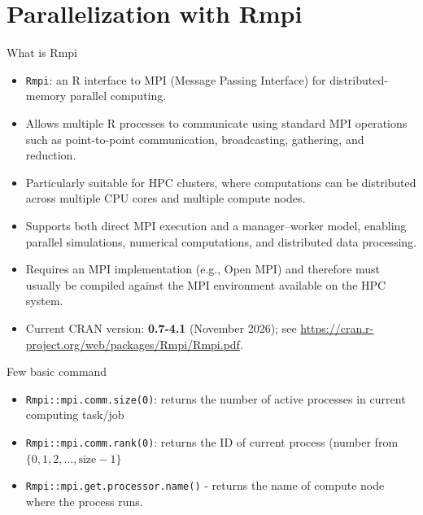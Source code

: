 \documentclass[compress,xcolor=table]{beamer}
\begin{document}
	
	
\section{Parallelization with Rmpi}
%




	
	\begin{frame}[fragile]{What  is Rmpi}
\begin{itemize} \footnotesize
	\item \texttt{Rmpi}: an R interface to MPI (Message Passing Interface) for distributed-memory parallel computing. 
	\item Allows multiple R processes to communicate using standard MPI operations such as point-to-point communication, broadcasting, gathering, and reduction. \item Particularly suitable for HPC clusters, where computations can be distributed across multiple CPU cores and multiple compute nodes. 
	\item Supports both direct MPI execution and a manager--worker model, enabling parallel simulations, numerical computations, and distributed data processing. \item Requires an MPI implementation (e.g., Open MPI) and therefore must usually be compiled against the MPI environment available on the HPC system. 
	\item Current CRAN version: \textbf{0.7-4.1} (November 2026); see \url{https://cran.r-project.org/web/packages/Rmpi/Rmpi.pdf}. 
\end{itemize}
	\end{frame}
	
	
	\begin{frame}{Few basic command}
		\begin{itemize}
			\item {\tt Rmpi::mpi.comm.size(0)}: returns the number of active processes in current computing task/job
			\item {\tt Rmpi::mpi.comm.rank(0)}: returns the ID of current process (number from $\{0,1,2,\ldots,\mbox{size}-1\}$ 
			\item {\tt Rmpi::mpi.get.processor.name()} - returns the name of compute node where the process runs.
		\end{itemize}
	\end{frame}
	
	
		
\end{document}
